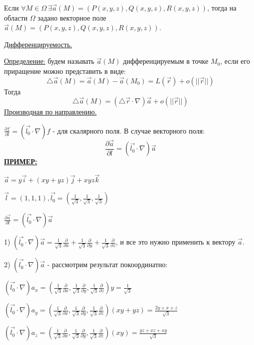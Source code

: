 \documentclass[12pt]{article}
\begin{document}
Если $\forall M \in \Omega \ \exists \overrightarrow{a}(M) = (P(x,y,z),Q(x,y,z),R(x,y,z))$, тогда на области $\Omega$ задано векторное поле $\overrightarrow{a}(M) = (P(x,y,z),Q(x,y,z),R(x,y,z))$.\par
\uline{Дифференцируемость.}\par
\uline{Определение:} будем называть $\overrightarrow{a}(M)$ дифференцируемым в точке $M_0$, если его приращение можно представить в виде:
$${\bigtriangleup \overrightarrow{a}(M)} = \overrightarrow{a}(M) - \overrightarrow{a}(M_0) = L(\overrightarrow{r})+o(||\overrightarrow{r}||)$$
Тогда
$${\bigtriangleup \overrightarrow{a}(M)} = ({\bigtriangleup \overrightarrow{r}} \cdot \nabla)\overrightarrow{a} + o(||\overrightarrow{r}||)$$
\uline{Производная по направлению.}\par
$\frac{\partial f}{\partial l} = (\overrightarrow{l_0} \cdot \nabla)f$ - для скалярного поля. В случае векторного поля:
$$\frac{\partial \overrightarrow{a}}{\partial l} = (\overrightarrow{l_0} \cdot \nabla)\overrightarrow{a}$$
\uline{\textbf{ПРИМЕР:}}\par
$\overrightarrow{a} = y \overrightarrow{i} + (xy + yz)\overrightarrow{j} + xyz \overrightarrow{k}$\par
$\overrightarrow{l} = (1,1,1), \overrightarrow{l_0} = (\frac{1}{\sqrt{3}},\frac{1}{\sqrt{3}},\frac{1}{\sqrt{3}})$\par
$\frac{\partial \overrightarrow{a}}{\partial l} = (\overrightarrow{l_0} \cdot \nabla)\overrightarrow{a}$\par
1) $(\overrightarrow{l_0} \cdot \nabla)\overrightarrow{a} = \frac{1}{\sqrt{3}} \frac{\partial}{\partial x} + \frac{1}{\sqrt{3}} \frac{\partial}{\partial y} + \frac{1}{\sqrt{3}} \frac{\partial}{\partial z}$, и все это нужно применить к вектору $\overrightarrow{a}$.\par
2) $(\overrightarrow{l_0} \cdot \nabla)\overrightarrow{a}$ - рассмотрим результат покоординатно:\par
$(\overrightarrow{l_0} \cdot \nabla)a_x = (\frac{1}{\sqrt{3}} \frac{\partial}{\partial x},\frac{1}{\sqrt{3}} \frac{\partial}{\partial y},\frac{1}{\sqrt{3}} \frac{\partial}{\partial z})y = \frac{1}{\sqrt{3}}$\par
$(\overrightarrow{l_0} \cdot \nabla)a_y = (\frac{1}{\sqrt{3}} \frac{\partial}{\partial x},\frac{1}{\sqrt{3}} \frac{\partial}{\partial y},\frac{1}{\sqrt{3}} \frac{\partial}{\partial z})(xy+yz) = \frac{2y+x+z}{\sqrt{3}}$\par
$(\overrightarrow{l_0} \cdot \nabla)a_z = (\frac{1}{\sqrt{3}} \frac{\partial}{\partial x},\frac{1}{\sqrt{3}} \frac{\partial}{\partial y},\frac{1}{\sqrt{3}} \frac{\partial}{\partial z})(xy) = \frac{yz+xz+xy}{\sqrt{3}}$\par
\end{document}
